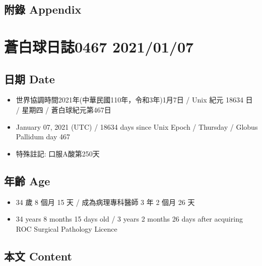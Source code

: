\documentclass[a5paper, 10pt
]{book}
\providecommand{\tightlist}{%
  \setlength{\itemsep}{0pt}\setlength{\parskip}{0pt}}
\begin{document}
\hypertarget{ux9644ux9304-appendix-36}{%
\subsection{附錄 Appendix}\label{ux9644ux9304-appendix-36}}

\hypertarget{ux84bcux767dux7403ux65e5ux8a8c0467-20210107}{%
\section{蒼白球日誌0467
2021/01/07}\label{ux84bcux767dux7403ux65e5ux8a8c0467-20210107}}

\hypertarget{ux65e5ux671f-date-37}{%
\subsection{日期 Date}\label{ux65e5ux671f-date-37}}

\begin{itemize}
\tightlist
\item
  世界協調時間2021年(中華民國110年，令和3年)1月7日 / Unix 紀元 18634 日
  / 星期四 / 蒼白球紀元第467日
\item
  January 07, 2021 (UTC) / 18634 days since Unix Epoch / Thursday /
  Globus Pallidum day 467
\item
  特殊註記: 口服A酸第250天
\end{itemize}

\hypertarget{ux5e74ux9f61-age-37}{%
\subsection{年齡 Age}\label{ux5e74ux9f61-age-37}}

\begin{itemize}
\tightlist
\item
  34 歲 8 個月 15 天 / 成為病理專科醫師 3 年 2 個月 26 天
\item
  34 years 8 months 15 days old / 3 years 2 months 26 days after
  acquiring ROC Surgical Pathology Licence
\end{itemize}

\hypertarget{ux672cux6587-content-37}{%
\subsection{本文 Content}\label{ux672cux6587-content-37}}
\end{document}

